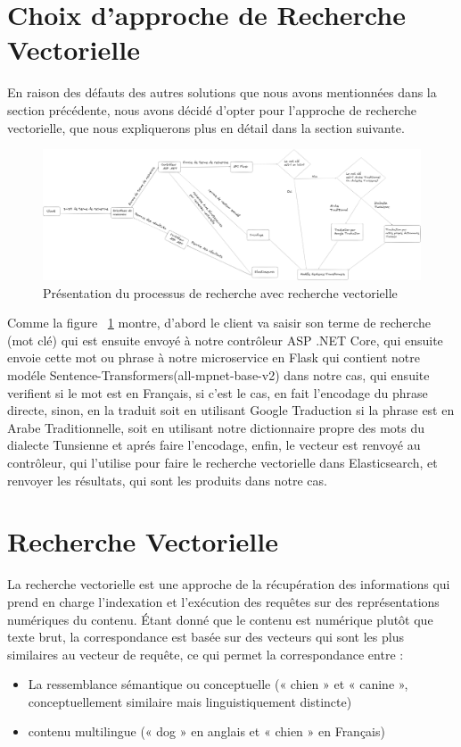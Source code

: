 \section{Choix d'approche de Recherche Vectorielle}
\noindent
En raison des défauts des autres solutions que nous avons mentionnées dans la section précédente, nous avons décidé d'opter pour l'approche de recherche vectorielle, que nous expliquerons plus en détail dans la section suivante.

\begin{figure}[H]
\centering
\includegraphics[width=1\textwidth]{logos/fullprocess.png}
\caption{Présentation du processus de recherche avec recherche vectorielle}
\label{fig:fullprocess}
\end{figure}

\noindent
Comme la figure ~\ref{fig:fullprocess} montre, d'abord le client va saisir son terme de recherche (mot clé) qui est ensuite envoyé à notre contrôleur ASP .NET Core, qui ensuite envoie cette mot ou phrase à notre microservice en Flask qui contient notre modéle Sentence-Transformers(all-mpnet-base-v2) dans notre cas, qui ensuite verifient si le mot est en Français, si c'est le cas, en fait l'encodage du phrase directe, sinon, en la traduit soit en utilisant Google Traduction si la phrase est en Arabe Traditionnelle, soit en utilisant notre dictionnaire propre des mots du dialecte Tunsienne et aprés faire l'encodage, enfin, le vecteur est renvoyé au contrôleur, qui l'utilise pour faire le recherche vectorielle dans Elasticsearch, et renvoyer les résultats, qui sont les produits dans notre cas.


\section{Recherche Vectorielle}
\noindent
La recherche vectorielle est une approche de la récupération des informations qui prend en charge l’indexation et l’exécution des requêtes sur des représentations numériques du contenu. Étant donné que le contenu est numérique plutôt que texte brut, la correspondance est basée sur des vecteurs qui sont les plus similaires au vecteur de requête, ce qui permet la correspondance entre :
\begin{itemize}
    \item La ressemblance sémantique ou conceptuelle (« chien » et « canine », conceptuellement similaire mais linguistiquement distincte)
    
    \item contenu multilingue (« dog » en anglais et « chien » en Français)
\end{itemize}

